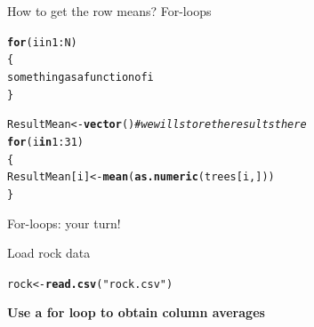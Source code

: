 \documentclass[10pt]{beamer}\usepackage[]{graphicx}\usepackage[]{color}
\makeatletter
\newcommand{\hlnum}[1]{\textcolor[rgb]{0.686,0.059,0.569}{#1}}%
\newcommand{\hlstr}[1]{\textcolor[rgb]{0.192,0.494,0.8}{#1}}%
\newcommand{\hlcom}[1]{\textcolor[rgb]{0.678,0.584,0.686}{\textit{#1}}}%
\newcommand{\hlopt}[1]{\textcolor[rgb]{0,0,0}{#1}}%
\newcommand{\hlstd}[1]{\textcolor[rgb]{0.345,0.345,0.345}{#1}}%
\newcommand{\hlkwa}[1]{\textcolor[rgb]{0.161,0.373,0.58}{\textbf{#1}}}%
\newcommand{\hlkwb}[1]{\textcolor[rgb]{0.69,0.353,0.396}{#1}}%
\newcommand{\hlkwd}[1]{\textcolor[rgb]{0.737,0.353,0.396}{\textbf{#1}}}%
\newenvironment{kframe}{%
 \def\at@end@of@kframe{}%
 \ifinner\ifhmode%
  \def\at@end@of@kframe{\end{minipage}}%
  \begin{minipage}{\columnwidth}%
 \fi\fi%
 \def\FrameCommand##1{\hskip\@totalleftmargin \hskip-\fboxsep
 \colorbox{shadecolor}{##1}\hskip-\fboxsep
     \hskip-\linewidth \hskip-\@totalleftmargin \hskip\columnwidth}%
 \MakeFramed {\advance\hsize-\width
   \@totalleftmargin\z@ \linewidth\hsize
   \@setminipage}}%
 {\par\unskip\endMakeFramed%
 \at@end@of@kframe}
\newenvironment{knitrout}{}{} %
\makeatother
\begin{document}
\begin{frame}[fragile]{How to get the row means? For-loops}

\begin{knitrout}
\color{fgcolor}\begin{kframe}
\begin{alltt}
  \hlkwd{for} (i in 1:N)
  \{
    something as a function of i
  \}
\end{alltt}
\end{kframe}
\end{knitrout}

  \pause
\begin{knitrout}
\color{fgcolor}\begin{kframe}
\begin{alltt}
\hlstd{ResultMean} \hlkwb{<-} \hlkwd{vector}\hlstd{()} \hlcom{# we will store the results there}
\hlkwa{for} \hlstd{(i} \hlkwa{in} \hlnum{1}\hlopt{:}\hlnum{31}\hlstd{)}
\hlstd{\{}
  \hlstd{ResultMean[i]} \hlkwb{<-} \hlkwd{mean}\hlstd{(}\hlkwd{as.numeric}\hlstd{(trees[i,]))}
\hlstd{\}}
\end{alltt}
\end{kframe}
\end{knitrout}

\end{frame}

\begin{frame}[fragile]{For-loops: your turn!}

Load rock data
\begin{knitrout}
\color{fgcolor}\begin{kframe}
\begin{alltt}
\hlstd{rock} \hlkwb{<-} \hlkwd{read.csv}\hlstd{(}\hlstr{"rock.csv"}\hlstd{)}
\end{alltt}
\end{kframe}
\end{knitrout}

  \centering
\textbf{\large Use a for loop to obtain column averages}

\end{frame}
\end{document}
